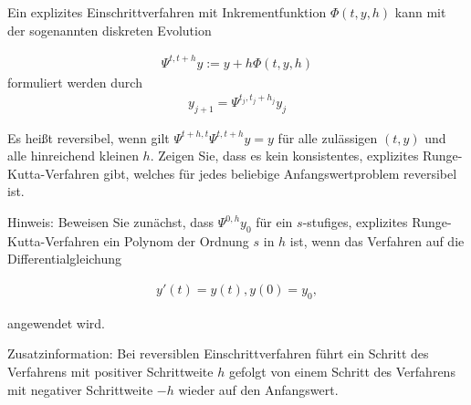 \begin{exercise}
  Ein explizites Einschrittverfahren mit Inkrementfunktion $\Phi(t,y,h)$
  kann mit der sogenannten diskreten Evolution

  \begin{align}
    \Psi^{t,t+h}y := y + h\Phi(t,y,h)
  \end{align}
  formuliert werden durch
  \begin{align}
    y_{j+1}=\Psi^{t_j,t_j + h_j} y_j
  \end{align}

  Es heißt reversibel, wenn gilt $\Psi^{t+h,t}\Psi^{t,t+h}y = y$
  für alle zulässigen $(t,y)$ und alle hinreichend kleinen $h$. Zeigen Sie, dass
  es kein konsistentes, explizites Runge-Kutta-Verfahren gibt, welches für jedes
  beliebige Anfangswertproblem reversibel ist.

  Hinweis: Beweisen Sie zunächst, dass $\Psi^{0,h} y_0$ für ein $s$-stufiges,
  explizites Runge-Kutta-Verfahren ein Polynom der Ordnung $s$ in $h$ ist, wenn
  das Verfahren auf die Differentialgleichung

  \begin{align}
    y'(t)=y(t), y(0)=y_0,
  \end{align}

  angewendet wird.

  Zusatzinformation: Bei reversiblen Einschrittverfahren führt ein Schritt des
  Verfahrens mit positiver Schrittweite $h$ gefolgt von einem Schritt des Verfahrens
  mit negativer Schrittweite $-h$ wieder auf den Anfangswert.
\end{exercise}

